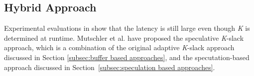 \documentclass[a4paper, 11pt, twoside]{report}
\begin{document}

\subsection{Hybrid Approach}
\label{subsec:hybrid approaches}

Experimental evaluations in \cite{10.1109/IPDPS.2013.29} show that the latency is still large even though \textit{K} is determined at runtime. Mutschler et al. \cite{Mutschler:2013:RSP:2488222.2488263} have proposed the speculative \textit{K}-slack approach, which is a combination of the original adaptive \textit{K}-slack approach discussed in Section \ref{subsec:buffer based approaches}, and the specutation-based approach discussed in Section~\ref{subsec:speculation based approaches}.\\
\end{document}
